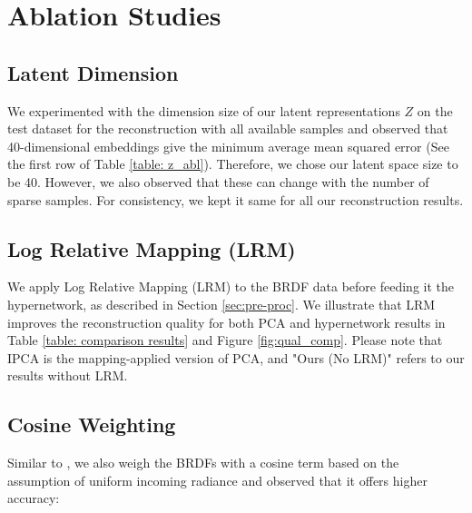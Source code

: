 \section{Ablation Studies}\label{sec:abl}
\subsection{Latent Dimension}
We experimented with the dimension size of our latent representations $Z$ on the test dataset for the reconstruction with all available samples and observed that 40-dimensional embeddings give the minimum average mean squared error (See the first row of Table \ref{table: z_abl}). Therefore, we chose our latent space size to be 40. However, we also observed that these can change with the number of sparse samples. For consistency, we kept it same for all our reconstruction results. 

\subsection{Log Relative Mapping (LRM)}\label{sec:lrm}
We apply Log Relative Mapping (LRM) \cite{nielsen2015optimal} to the BRDF data before feeding it the hypernetwork, as described in Section \ref{sec:pre-proc}. We illustrate that LRM improves the reconstruction quality for both PCA and hypernetwork results in Table \ref{table: comparison results} and Figure \ref{fig:qual_comp}. Please note that IPCA is the mapping-applied version of PCA, and "Ours (No LRM)" refers to our results without LRM.


\subsection{Cosine Weighting}
Similar to \cite{ngan2005experimental}, we also weigh the BRDFs with a cosine term based on the assumption of uniform incoming radiance and observed that it offers higher accuracy:

